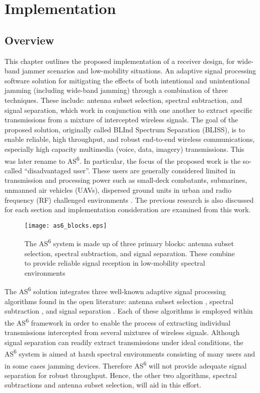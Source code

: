 \chapter{Implementation}
\label{ch:implementation}

\section{Overview}

This chapter outlines the proposed implementation of a receiver design, for wide-band jammer scenarios and low-mobility situations.  An adaptive signal processing software solution for mitigating the effects of both intentional and unintentional jamming (including wide-band jamming) through a combination of three techniques.  These include: antenna subset selection, spectral subtraction, and signal separation, which work in conjunction with one another to extract specific transmissions from a mixture of intercepted wireless signals. The goal of the proposed solution, originally called BLInd Spectrum Separation (BLISS), is to enable reliable, high throughput, and robust end-to-end wireless communications, especially high capacity multimedia (voice, data, imagery) transmissions. This was later rename to AS\textsuperscript{6}.  In particular, the focus of the proposed work is the so-called ``disadvantaged user''.  These users are generally considered limited in transmission and processing power such as small-deck combatants, submarines, unmanned air vehicles (UAVs), dispersed ground units in urban and radio frequency (RF) challenged environments \cite{midterm_report}.  The previous research is also discussed for each section and implementation consideration are examined from this work.\\

\begin{figure}
\centering
\texttt{[image: as6\_blocks.eps]}
\caption{The AS\textsuperscript{6} system is made up of three primary blocks: antenna subset selection, spectral subtraction, and signal separation.  These combine to provide reliable signal reception in low-mobility spectral environments}
\end{figure}

The AS\textsuperscript{6} solution integrates three well-known adaptive signal processing algorithms found in the open literature: antenna subset selection \cite{antss}, spectral subtraction \cite{boll}, and signal separation \cite{AMUSE}. Each of these algorithms is employed within the AS\textsuperscript{6} framework in order to enable the process of extracting individual transmissions intercepted from several mixtures of wireless signals. Although signal separation can readily extract transmissions under ideal conditions, the AS\textsuperscript{6} system is aimed at harsh spectral environments consisting of many users and in some cases jamming devices. Therefore AS\textsuperscript{6} will not provide adequate signal separation for robust throughput.  Hence, the other two algorithms, spectral subtractions and antenna subset selection, will aid in this effort.\\

